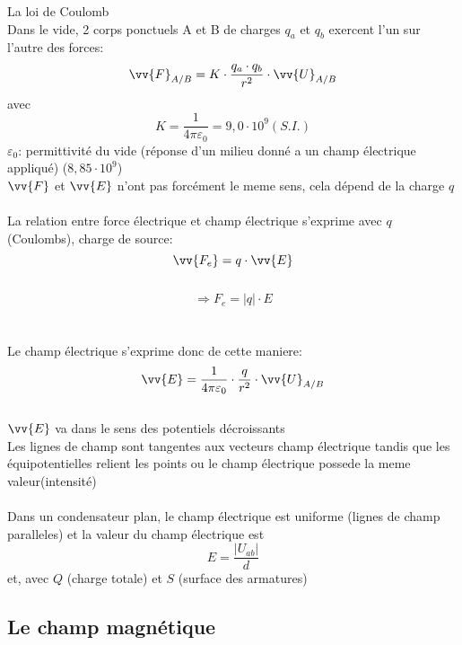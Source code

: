 \begin{Definition}
La loi de Coulomb\\
Dans le vide, 2 corps ponctuels A et B de charges $q_{a}$ et $q_{b}$ exercent l'un sur l'autre des forces: \\
$$ \vv{F}_{A/B} = K \cdot \dfrac{q_{a}\cdot q_{b}}{r^2} \cdot \vv{U}_{A/B} $$
avec\\
$$K=\dfrac{1}{4\pi\varepsilon_{0}}= 9,0\cdot 10^9(S.I.)$$
$\varepsilon_{0}$: permittivité du vide (réponse d'un milieu donné a un champ électrique appliqué) ($8,85\cdot 10^9$)\\
\danger[5ex] \qquad $\vv{F}$ et $\vv{E}$ n'ont pas forcément le meme sens, cela dépend de la charge $q$\\\\

La relation entre force électrique et champ électrique s'exprime avec $q$ (Coulombs), charge de source:
$$\vv{F_{e}}=q\cdot \vv{E}$$\\
$$\Rightarrow F_{e}=|q|\cdot E$$\\\\
Le champ électrique s'exprime donc de cette maniere:
$$\vv{E}= \dfrac{1}{4\pi\varepsilon_{0}}\cdot\dfrac{q}{r^2}\cdot\vv{U}_{A/B}$$\\
$\vv{E}$ va dans le sens des potentiels décroissants\\
Les lignes de champ sont tangentes aux vecteurs champ électrique tandis que les équipotentielles relient les points ou le champ électrique possede la meme valeur(intensité) \\\\
Dans un condensateur plan, le champ électrique est uniforme (lignes de champ paralleles) et la valeur du champ électrique est
$$E=\dfrac{|U_{ab}|}{d}$$
et, avec $Q$ (charge totale) et $S$ (surface des armatures)
\\

\end{Definition}


\subsection{Le champ magnétique}
